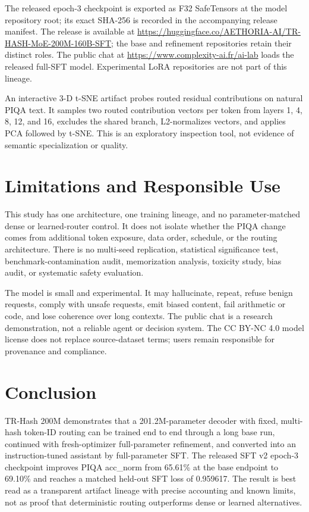 \documentclass[10pt,twocolumn]{article}
\newcommand{\model}{TR-Hash 200M}
\begin{document}
The released epoch-3 checkpoint is exported as F32 SafeTensors at the model repository root; its exact SHA-256 is recorded in the accompanying release manifest. The release is available at \url{https://huggingface.co/AETHORIA-AI/TR-HASH-MoE-200M-160B-SFT}; the base and refinement repositories retain their distinct roles. The public chat at \url{https://www.complexity-ai.fr/ai-lab} loads the released full-SFT model. Experimental LoRA repositories are not part of this lineage.

An interactive 3-D t-SNE artifact probes routed residual contributions on natural PIQA text. It samples two routed contribution vectors per token from layers 1, 4, 8, 12, and 16, excludes the shared branch, L2-normalizes vectors, and applies PCA followed by t-SNE. This is an exploratory inspection tool, not evidence of semantic specialization or quality.

\section{Limitations and Responsible Use}
This study has one architecture, one training lineage, and no parameter-matched dense or learned-router control. It does not isolate whether the PIQA change comes from additional token exposure, data order, schedule, or the routing architecture. There is no multi-seed replication, statistical significance test, benchmark-contamination audit, memorization analysis, toxicity study, bias audit, or systematic safety evaluation.

The model is small and experimental. It may hallucinate, repeat, refuse benign requests, comply with unsafe requests, emit biased content, fail arithmetic or code, and lose coherence over long contexts. The public chat is a research demonstration, not a reliable agent or decision system. The CC BY-NC 4.0 model license does not replace source-dataset terms; users remain responsible for provenance and compliance.

\section{Conclusion}
\model{} demonstrates that a 201.2M-parameter decoder with fixed, multi-hash token-ID routing can be trained end to end through a long base run, continued with fresh-optimizer full-parameter refinement, and converted into an instruction-tuned assistant by full-parameter SFT. The released SFT v2 epoch-3 checkpoint improves PIQA acc\_norm from 65.61\% at the base endpoint to 69.10\% and reaches a matched held-out SFT loss of 0.959617. The result is best read as a transparent artifact lineage with precise accounting and known limits, not as proof that deterministic routing outperforms dense or learned alternatives.
\end{document}
